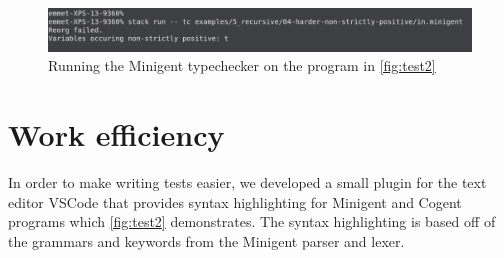 \begin{figure}
    \centering
    \includegraphics[width=\linewidth]{content/test2result.png}
    \caption{Running the Minigent typechecker on the program in \autoref{fig:test2}}
    \label{fig:test2result}
\end{figure}

\section{Work efficiency}

In order to make writing tests easier, we developed a small plugin for the text editor VSCode
that provides syntax highlighting for Minigent and Cogent programs which \autoref{fig:test2} demonstrates.
The syntax highlighting is based off of the grammars and keywords from the Minigent parser and lexer.

